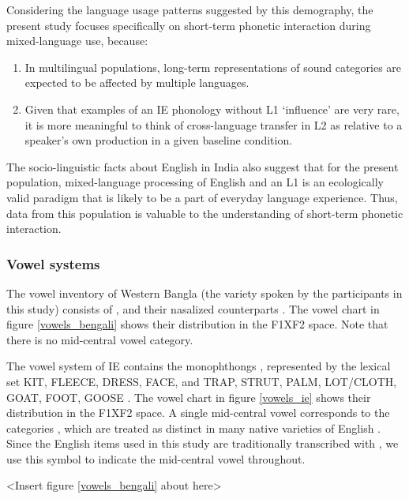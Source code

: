\documentclass[12 pt]{article}
\newcommand{\nt}[1]{\textipa{[#1]}} %
\begin{document}
Considering the language usage patterns suggested by this demography, the present study focuses specifically on short-term phonetic interaction during mixed-language use, because:

\begin{enumerate}[label=(\roman*)]
	\item In multilingual populations, long-term representations of sound categories are expected to be affected by multiple languages. 
	\item Given that examples of an IE phonology without L1 `influence' are very rare, it is more meaningful to think of cross-language transfer in L2 as relative to a speaker's own production in a given baseline condition.
\end{enumerate}

The socio-linguistic facts about English in India also suggest that for the present population, mixed-language processing of English and an L1 is an ecologically valid paradigm that is likely to be a part of everyday language experience. Thus, data from this population is valuable to the understanding of short-term phonetic interaction.

\subsubsection*{Vowel systems} \label{vowel systems}
The vowel inventory of Western Bangla (the variety spoken by the participants in this study) consists of \nt{i, e, \ae, a, O, o, u}, and their nasalized counterparts \citep{garry2001facts}. The vowel chart in figure \ref{vowels_bengali} shows their distribution in the F1XF2 space. Note that there is no mid-central vowel category. 


The vowel system of IE contains the monophthongs \nt{I, i, E, e, \ae, @/2/3:, a:, O, o, U, u}, represented by the lexical set KIT, FLEECE, DRESS, FACE, and TRAP, STRUT, PALM, LOT/CLOTH, GOAT, FOOT, GOOSE \citep{wells1982accents, masica1972sound}. The vowel chart in figure \ref{vowels_ie} shows their distribution in the F1XF2 space. 
A single mid-central vowel corresponds to the categories \nt{2,@,3:}, which are treated as distinct in many native varieties of English \citep{nihalani1979indian,wells1982accents,hickey2005legacies,bansal1969intelligibility}. Since the English items used in this study are traditionally transcribed with \nt{2}, we use this symbol to indicate the mid-central vowel throughout. 
 
<Insert figure \ref{vowels_bengali} about here>
\end{document}
